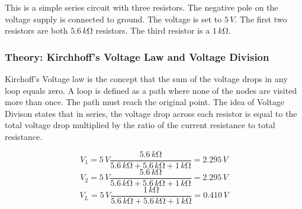 \documentclass[11pt]{article}
\begin{document}
This is a simple series circuit with three resistors. The negative pole on the voltage supply is connected to ground. The voltage is set to $5\,V$. The first two resistors are both $5.6\,k\si\ohm$ resistors. The third resistor is a $1\,k\si\ohm$.


\subsubsection{Theory: Kirchhoff's Voltage Law and Voltage Division}
Kirchoff's Voltage law is the concept that the sum of the voltage drops in any loop equals zero. A loop is defined as a path where none of the nodes are visited more than once. The path must reach the original point. The idea of Voltage Divison states that in series, the voltage drop across each resistor is equal to the total voltage drop multiplied by the ratio of the current resistance to total resistance.

\begin{equation}
	\label{eq:1}
	V_1 = 5\,V \frac{5.6\,k\si\ohm}{5.6\,k\si\ohm + 5.6\,k\si\ohm + 1\,k\si\ohm} = 2.295\,V
\end{equation}
\begin{equation}
	\label{eq:2}
	V_2 = 5\,V \frac{5.6\,k\si\ohm}{5.6\,k\si\ohm + 5.6\,k\si\ohm + 1\,k\si\ohm} = 2.295\,V
\end{equation}
\begin{equation}
	\label{eq:3}
	V_L = 5\,V \frac{1\,k\si\ohm}{5.6\,k\si\ohm + 5.6\,k\si\ohm + 1\,k\si\ohm} = 0.410\,V
\end{equation}
\end{document}
